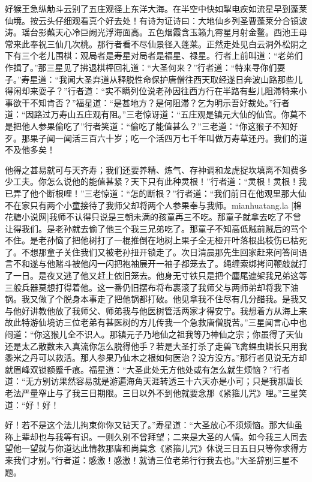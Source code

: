\documentclass[12pt,UTF8]{ctexbook}
\begin{document}
好猴王急纵觔斗云别了五庄观径上东洋大海。在半空中快如掣电疾如流星早到蓬莱仙境。按云头仔细观看真个好去处！有诗为证诗曰：大地仙乡列圣曹蓬莱分合镇波涛。瑶台影蘸天心冷巨阙光浮海面高。五色烟霞含玉籁九霄星月射金鳌。西池王母常来此奉祝三仙几次桃。那行者看不尽仙景径入蓬莱。正然走处见白云洞外松阴之下有三个老儿围棋：观局者是寿星对局者是福星、禄星。行者上前叫道：“老弟们作揖了。”那三星见了拂退棋枰回礼道：“大圣何来？”行者道：“特来寻你们耍子。”寿星道：“我闻大圣弃道从释脱性命保护唐僧往西天取经遂日奔波山路那些儿得闲却来耍子？”行者道：“实不瞒列位说老孙因往西方行在半路有些儿阻滞特来小事欲干不知肯否？”福星道：“是甚地方？是何阻滞？乞为明示吾好裁处。”行者道：“因路过万寿山五庄观有阻。”三老惊讶道：“五庄观是镇元大仙的仙宫。你莫不是把他人参果偷吃了”行者笑道：“偷吃了能值甚么？”三老道：“你这猴子不知好歹。那果子闻一闻活三百六十岁；吃一个活四万七千年叫做万寿草还丹。我们的道不及他多矣！

他得之甚易就可与天齐寿；我们还要养精、炼气、存神调和龙虎捉坎填离不知费多少工夫。你怎么说他的能值甚紧？天下只有此种灵根！”行者道：“灵根！灵根！我已弄了他个断根哩！”三老惊道：“怎的断根？”行者道：“我们前日在他观里那大仙不在家只有两个小童接待了我师父却将两个人参果奉与我师。mianhuatang.la [棉花糖小说网]我师不认得只说是三朝未满的孩童再三不吃。那童子就拿去吃了不曾让得我们。是老孙就去偷了他三个我三兄弟吃了。那童子不知高低贼前贼后的骂个不住。是老孙恼了把他树打了一棍推倒在地树上果子全无桠开叶落根出枝伤已枯死了。不想那童子关住我们又被老孙扭开锁走了。次日清晨那先生回家赶来问答间语言不和遂与他赌斗被他闪一闪把袍袖展开一袖子都笼去了。绳缠索绑拷问鞭敲就打了一日。是夜又逃了他又赶上依旧笼去。他身无寸铁只是把个塵尾遮架我兄弟这等三般兵器莫想打得着他。这一番仍旧摆布将布裹滚了我师父与两师弟却将我下油锅。我又做了个脱身本事走了把他锅都打破。他见拿我不住尽有几分醋我。是我又与他好讲教他放了我师父、师弟我与他医树管活两家才得安宁。我想着方从海上来故此特游仙境访三位老弟有甚医树的方儿传我一个急救唐僧脱苦。”三星闻言心中也闷道：“你这猴儿全不识人。那镇元子乃地仙之祖我等乃神仙之宗；你虽得了天仙还是太乙散数未入真流你怎么脱得他手？若是大圣打杀了走兽飞禽蜾虫鳞长只用我黍米之丹可以救活。那人参果乃仙木之根如何医治？没方没方。”那行者见说无方却就眉峰双锁额蹙千痕。福星道：“大圣此处无方他处或有怎么就生烦恼？”行者道：“无方别访果然容易就是游遍海角天涯转透三十六天亦是小可；只是我那唐长老法严量窄止与了我三日期限。三日以外不到他就要念那《紧箍儿咒》哩。”三星笑道：“好！好！

好！若不是这个法儿拘束你你又钻天了。”寿星道：“大圣放心不须烦恼。那大仙虽称上辈却也与我等有识。一则久别不曾拜望；二来是大圣的人情。如今我三人同去望他一望就与你道达此情教那唐和尚莫念《紧箍儿咒》休说三日五日只等你求得方来我们才别。”行者道：感激！感激！就请三位老弟行行我去也。”大圣辞别三星不题。
\end{document}
